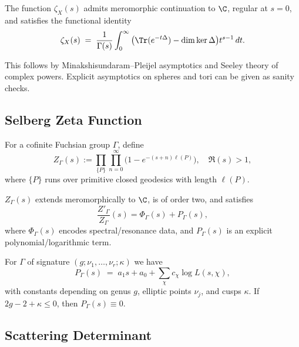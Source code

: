 \begin{theorem}
\label{thm:zeta-compact-cont}
The function $\zeta_X(s)$ admits meromorphic continuation
to $\C$, regular at $s=0$, and satisfies the functional identity
\[
\zeta_X(s) \;=\; \frac{1}{\Gamma(s)} 
\int_0^\infty \big(\Tr(e^{-t\Delta}) - \dim\ker \Delta\big) t^{s-1}\,dt.
\]
\end{theorem}

\begin{remark}
This follows by Minakshisundaram--Pleijel asymptotics and Seeley theory of
complex powers. Explicit asymptotics on spheres and tori can be
given as sanity checks. %
\end{remark}

\subsection{Selberg Zeta Function}
\label{subsec:selberg-zeta}

\begin{definition}
\label{def:selberg-zeta}
For a cofinite Fuchsian group $\Gamma$, define
\[
Z_\Gamma(s) := \prod_{\{P\}}\prod_{n=0}^\infty
\Big(1 - e^{-(s+n)\ell(P)}\Big),
\quad \Re(s)>1,
\]
where $\{P\}$ runs over primitive closed geodesics with length $\ell(P)$.
\end{definition}

\begin{theorem}
\label{thm:selberg-analytic}
$Z_\Gamma(s)$ extends meromorphically to $\C$,
is of order two, and satisfies
\[
\frac{Z'_\Gamma}{Z_\Gamma}(s) = \Phi_\Gamma(s) + P_\Gamma(s),
\]
where $\Phi_\Gamma(s)$ encodes spectral/resonance data,
and $P_\Gamma(s)$ is an explicit polynomial/logarithmic term.
\end{theorem}

\begin{lemma}
\label{lem:poly-structure}
For $\Gamma$ of signature $(g;\nu_1,\dots,\nu_r;\kappa)$ we have
\[
P_\Gamma(s) \;=\;
a_1 s + a_0 + \sum_{\chi} c_\chi \log L(s,\chi),
\]
with constants depending on genus $g$, elliptic points $\nu_j$,
and cusps $\kappa$. 
If $2g-2+\kappa\leq 0$, then $P_\Gamma(s)\equiv 0$.
\]
\end{lemma}

\subsection{Scattering Determinant}
\label{subsec:scattering-det}

